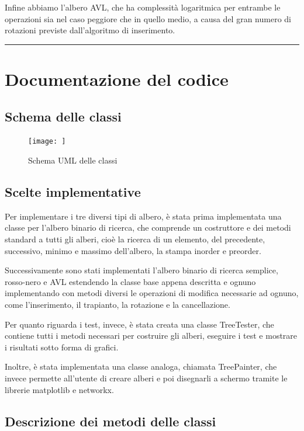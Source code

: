\documentclass[a4paper,12pt]{article}
\begin{document}
    Infine abbiamo l'albero AVL, che ha complessità logaritmica per entrambe le operazioni sia nel caso peggiore che in
    quello medio, a causa del gran numero di rotazioni previste dall'algoritmo di inserimento.

    \par\noindent\rule{\textwidth}{0.2pt}
    \section{Documentazione del codice}

    \subsection{Schema delle classi}

    \begin{figure}[h]
        \centering
        \texttt{[image: ]}
        \caption{Schema UML delle classi}
        \label{fig:esempio}
    \end{figure}

    \subsection{Scelte implementative}
    Per implementare i tre diversi tipi di albero, è stata prima implementata una classe per l'albero binario di
    ricerca, che comprende un costruttore e dei metodi standard a tutti gli alberi, cioè la ricerca di un elemento,
    del precedente, successivo, minimo e massimo dell'albero, la stampa inorder e preorder.

    Successivamente sono stati implementati l'albero binario di ricerca semplice, rosso-nero e AVL estendendo la
    classe base appena descritta e ognuno implementando con metodi diversi le operazioni di modifica necessarie ad
    ognuno, come l'inserimento, il trapianto, la rotazione e la cancellazione.

    Per quanto riguarda i test, invece, è stata creata una classe TreeTester, che contiene tutti i metodi necessari
    per costruire gli alberi, eseguire i test e mostrare i risultati sotto forma di grafici.

    Inoltre, è stata implementata una classe analoga, chiamata TreePainter, che invece permette all'utente di creare
    alberi e poi disegnarli a schermo tramite le librerie matplotlib e networkx.

    \subsection{Descrizione dei metodi delle classi}
\end{document}
